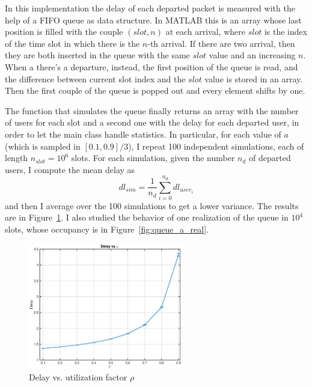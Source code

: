 \documentclass[10pt]{article}
\begin{document}
In this implementation the delay of each departed packet is measured with the help of a FIFO queue as data structure. In MATLAB this is an array whose last position is filled with the couple $(slot, n)$ at each arrival, where $slot$ is the index of the time slot in which there is the $n$-th arrival. If there are two arrival, then they are both inserted in the queue with the same $slot$ value and an increasing $n$. When a there's a departure, instead, the first position of the queue is read, and the difference between current slot index and the $slot$ value is stored in an array. Then the first couple of the queue is popped out and every element shifts by one. 

The function that simulates the queue finally returns an array with the number of users for each slot and a second one with the delay for each departed user, in order to let the main class handle statistics. In particular, for each value of $a$ (which is sampled in $[0.1, 0.9]/3$), I repeat 100 independent simulations, each of length $n_{slot} = 10^6$ slots. For each simulation, given the number $n_{d}$ of departed users, I compute the mean delay as 
\begin{equation}
  dl_{sim} = \frac{1}{n_d} \sum_{i = 0}^{n_d} dl_{user_i}
\end{equation}
and then I average over the 100 simulations to get a lower variance. The results are in Figure~\ref{fig:queue_a}.
I also studied the behavior of one realization of the queue in $10^4$ slots, whose occupancy is in Figure~\ref{fig:queue_a_real}.

\begin{figure}[h!]
\centering
  \includegraphics[width = 0.6\textwidth]{queue_a_dl}
  \caption{Delay vs. utilization factor $\rho$}
  \label{fig:queue_a}
\end{figure}
\end{document}
